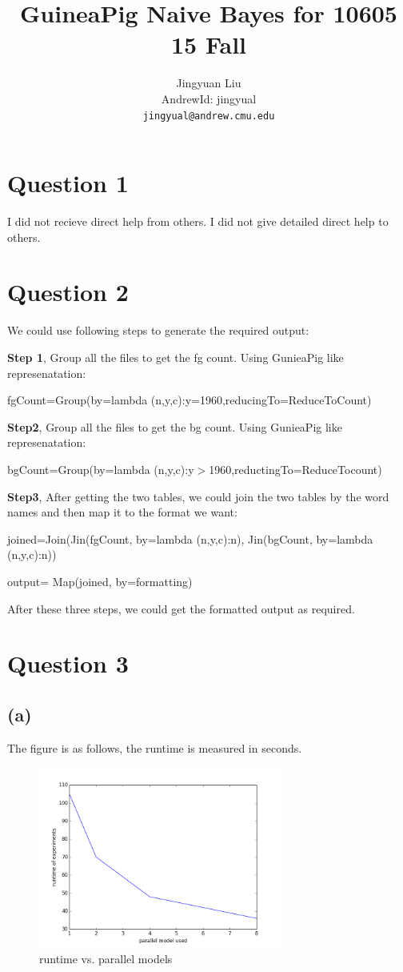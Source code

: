 \documentclass{article} %
\title{GuineaPig Naive Bayes for 10605 15 Fall}
\author{
Jingyuan Liu\\
AndrewId: jingyual\\
\texttt{jingyual@andrew.cmu.edu} \\
}
\begin{document}
\maketitle


\section{Question 1}


I did not recieve direct help from others. I did not give detailed direct help to others.


\section{Question 2}
We could use following steps to generate the required output:

\textbf{Step 1}, Group all the files to get the fg count. Using GunieaPig
like represenatation:

\qquad fgCount=Group(by=lambda (n,y,c):y=1960,reducingTo=ReduceToCount)

\textbf{Step2}, Group all the files to get the bg count. Using GunieaPig like
represenatation:

\qquad bgCount=Group(by=lambda (n,y,c):y$>$1960,reductingTo=ReduceTocount)

\textbf{Step3}, After getting the two tables, we could join the two tables by the word
names and then map it to the format we want:

\qquad joined=Join(Jin(fgCount, by=lambda (n,y,c):n), Jin(bgCount,
by=lambda (n,y,c):n))

\qquad output= Map(joined, by=formatting)

After these three steps, we could get the formatted output as required.

\section{Question 3}

\subsection{(a)}
The figure is as follows, the runtime is measured in seconds.
\begin{figure}[h]
\begin{center}
\includegraphics[width=8cm]{pic/run.png}
\end{center}
\caption{runtime vs. parallel models}
\label{fig:monitoring}
\end{figure}
\end{document}
